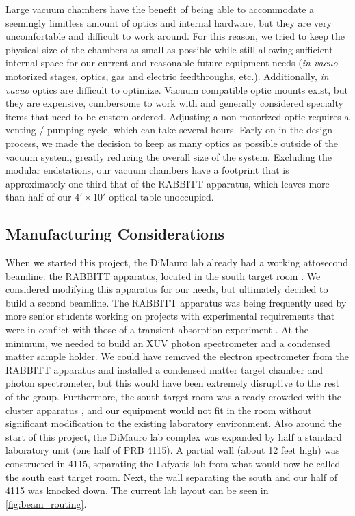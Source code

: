 Large vacuum chambers have the benefit of being able to accommodate a seemingly limitless amount of optics and internal hardware, but they are very uncomfortable and difficult to work around. For this reason, we tried to keep the physical size of the chambers as small as possible while still allowing sufficient internal space for our current and reasonable future equipment needs (\textit{in vacuo} motorized stages, optics, gas and electric feedthroughs, etc.). Additionally, \textit{in vacuo} optics are difficult to optimize. Vacuum compatible optic mounts exist, but they are expensive, cumbersome to work with and generally considered specialty items that need to be custom ordered. Adjusting a non-motorized optic requires a venting / pumping cycle, which can take several hours. Early on in the design process, we made the decision to keep as many optics as possible outside of the vacuum system, greatly reducing the overall size of the system. Excluding the modular endstations, our vacuum chambers have a footprint that is approximately one third that of the RABBITT apparatus, which leaves more than half of our $4' \times 10'$ optical table unoccupied.

\subsection{Manufacturing Considerations}

When we started this project, the DiMauro lab already had a working attosecond beamline: the RABBITT apparatus, located in the south target room \cite{chirlaAttosecondPulseGeneration2011}. We considered modifying this apparatus for our needs, but ultimately decided to build a second beamline. The RABBITT apparatus was being frequently used by more senior students working on projects with experimental requirements that were in conflict with those of a transient absorption experiment \cite{kiesewetterDynamicsNearThresholdAttosecond2019,gormanAttosecondProbingElectron2018}. At the minimum, we needed to build an XUV photon spectrometer and a condensed matter sample holder. We could have removed the electron spectrometer from the RABBITT apparatus and installed a condensed matter target chamber and photon spectrometer, but this would have been extremely disruptive to the rest of the group. Furthermore, the south target room was already crowded with the cluster apparatus \cite{wangMidinfraredStrongfieldLaser2018}, and our equipment would not fit in the room without significant modification to the existing laboratory environment. Also around the start of this project, the DiMauro lab complex was expanded by half a standard laboratory unit (one half of PRB 4115). A partial wall (about 12 feet high) was constructed in 4115, separating the Lafyatis lab from what would now be called the south east target room. Next, the wall separating the south and our half of 4115 was knocked down. The current lab layout can be seen in \cref{fig:beam_routing}.

